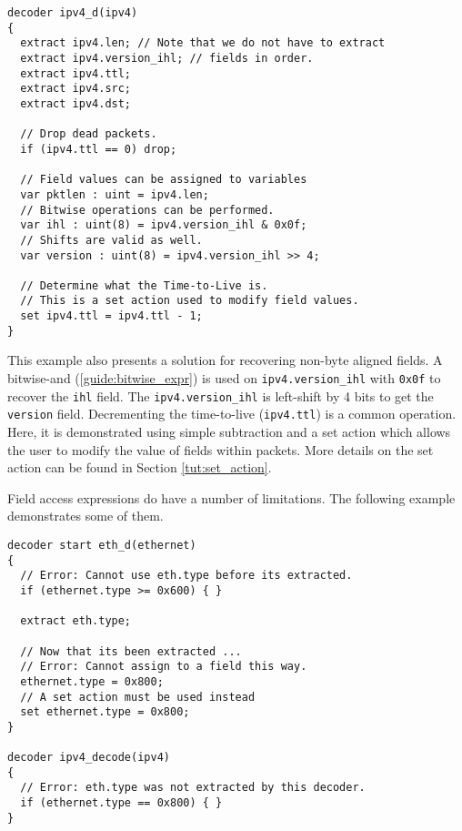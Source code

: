 \begin{codepage}
\begin{lstlisting}
decoder ipv4_d(ipv4)
{
  extract ipv4.len; // Note that we do not have to extract
  extract ipv4.version_ihl; // fields in order.
  extract ipv4.ttl;
  extract ipv4.src;
  extract ipv4.dst;

  // Drop dead packets.
  if (ipv4.ttl == 0) drop;

  // Field values can be assigned to variables
  var pktlen : uint = ipv4.len;
  // Bitwise operations can be performed.
  var ihl : uint(8) = ipv4.version_ihl & 0x0f;
  // Shifts are valid as well.
  var version : uint(8) = ipv4.version_ihl >> 4;

  // Determine what the Time-to-Live is.
  // This is a set action used to modify field values.
  set ipv4.ttl = ipv4.ttl - 1;
}
\end{lstlisting}
\end{codepage}

This example also presents a solution for recovering non-byte aligned
fields. A bitwise-and (\ref{guide:bitwise_expr}) is used on \texttt{ipv4.version\_ihl}
with \texttt{0x0f} to recover the \texttt{ihl} field. The 
\texttt{ipv4.version\_ihl} is left-shift by 4 bits to get the \texttt{version} field. Decrementing the time-to-live (\texttt{ipv4.ttl}) is a common operation. Here, it is demonstrated using simple subtraction and a set action which allows the user to modify the value of fields within packets. More details on the set action can be found in Section \ref{tut:set_action}.

Field access expressions do have a number of limitations. The following example
demonstrates some of them.

\begin{codepage}
\begin{lstlisting}
decoder start eth_d(ethernet)
{
  // Error: Cannot use eth.type before its extracted.
  if (ethernet.type >= 0x600) { }

  extract eth.type;

  // Now that its been extracted ...
  // Error: Cannot assign to a field this way.
  ethernet.type = 0x800;
  // A set action must be used instead
  set ethernet.type = 0x800;
}

decoder ipv4_decode(ipv4)
{
  // Error: eth.type was not extracted by this decoder.
  if (ethernet.type == 0x800) { }
}
\end{lstlisting}
\end{codepage}

